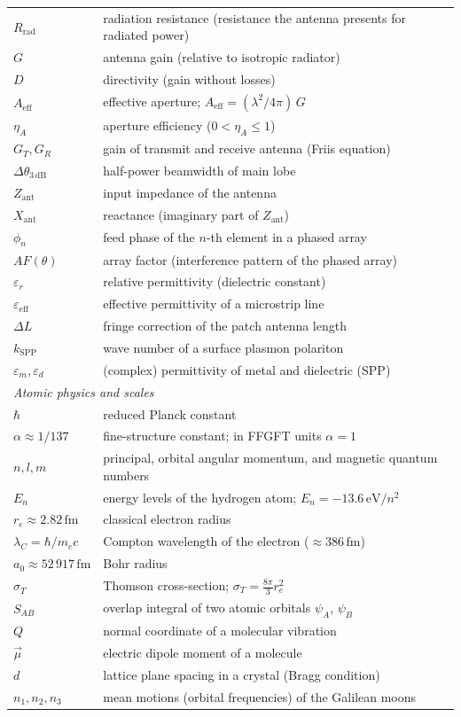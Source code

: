\begin{longtable}{@{}lp{11cm}@{}}
$R_\mathrm{rad}$ & radiation resistance (resistance the antenna presents for radiated power) \\
$G$ & antenna gain (relative to isotropic radiator) \\
$D$ & directivity (gain without losses) \\
$A_\mathrm{eff}$ & effective aperture; $A_\mathrm{eff} = (\lambda^2/4\pi)\,G$ \\
$\eta_A$ & aperture efficiency ($0 < \eta_A \leq 1$) \\
$G_T, G_R$ & gain of transmit and receive antenna (Friis equation) \\
$\Delta\theta_{3\,\mathrm{dB}}$ & half-power beamwidth of main lobe \\
$Z_\mathrm{ant}$ & input impedance of the antenna \\
$X_\mathrm{ant}$ & reactance (imaginary part of $Z_\mathrm{ant}$) \\
$\phi_n$ & feed phase of the $n$-th element in a phased array \\
$AF(\theta)$ & array factor (interference pattern of the phased array) \\
$\varepsilon_r$ & relative permittivity (dielectric constant) \\
$\varepsilon_\mathrm{eff}$ & effective permittivity of a microstrip line \\
$\Delta L$ & fringe correction of the patch antenna length \\
$k_\mathrm{SPP}$ & wave number of a surface plasmon polariton \\
$\varepsilon_m, \varepsilon_d$ & (complex) permittivity of metal and dielectric (SPP) \\
\midrule
\multicolumn{2}{l}{\textit{Atomic physics and scales}} \\
$\hbar$ & reduced Planck constant \\
$\alpha \approx 1/137$ & fine-structure constant; in FFGFT units $\alpha = 1$ \\
$n, l, m$ & principal, orbital angular momentum, and magnetic quantum numbers \\
$E_n$ & energy levels of the hydrogen atom; $E_n = -13.6\,\mathrm{eV}/n^2$ \\
$r_e \approx 2.82\,\mathrm{fm}$ & classical electron radius \\
$\lambda_C = \hbar/m_e c$ & Compton wavelength of the electron (${\approx}386\,\mathrm{fm}$) \\
$a_0 \approx 52\,917\,\mathrm{fm}$ & Bohr radius \\
$\sigma_T$ & Thomson cross-section; $\sigma_T = \tfrac{8\pi}{3}r_e^2$ \\
$S_{AB}$ & overlap integral of two atomic orbitals $\psi_A$, $\psi_B$ \\
$Q$ & normal coordinate of a molecular vibration \\
$\vec{\mu}$ & electric dipole moment of a molecule \\
$d$ & lattice plane spacing in a crystal (Bragg condition) \\
$n_1, n_2, n_3$ & mean motions (orbital frequencies) of the Galilean moons \\
\bottomrule
\end{longtable}


